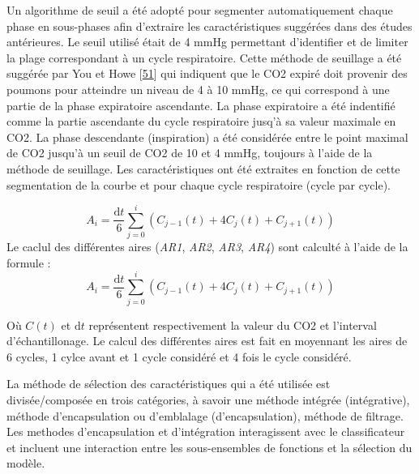 \documentclass[12pt,]{article}
\begin{document}
Un algorithme de seuil a été adopté pour segmenter automatiquement
chaque phase en sous-phases afin d'extraire les caractéristiques
suggérées dans des études antérieures. Le seuil utilisé était de 4 mmHg
permettant d'identifier et de limiter la plage correspondant à un cycle
respiratoire. Cette méthode de seuillage a été suggérée par You et Howe
{[}\protect\hyperlink{ref-you1994expiratory}{51}{]} qui indiquent que le
CO2 expiré doit provenir des poumons pour atteindre un niveau de 4 à 10
mmHg, ce qui correspond à une partie de la phase expiratoire ascendante.
La phase expiratoire a été indentifié comme la partie ascendante du
cycle respiratoire jusq'à sa valeur maximale en CO2. La phase
descendante (inspiration) a été considérée entre le point maximal de CO2
jusqu'à un seuil de CO2 de 10 et 4 mmHg, toujours à l'aide de la méthode
de seuillage. Les caractéristiques ont été extraites en fonction de
cette segmentation de la courbe et pour chaque cycle respiratoire (cycle
par cycle).

\[A_{i}=\frac{\mathrm{d}t}{6}\sum_{j=0}^{i}(C_{j-1}(t)+4C_{j}(t)+C_{j+1}(t))\]
Le caclul des différentes aires (\emph{AR1}, \emph{AR2}, \emph{AR3},
\emph{AR4}) sont calculté à l'aide de la formule : \begin{equation}
  A_{i}=\frac{\mathrm{d}t}{6}\sum_{j=0}^{i}(C_{j-1}(t)+4C_{j}(t)+C_{j+1}(t))
\label{eq:ARi}
\end{equation}

Où \(C(t)\) et \(\mathrm{d}t\) représentent respectivement la valeur du
CO2 et l'interval d'échantillonage. Le calcul des différentes aires est
fait en moyennant les aires de 6 cycles, 1 cylce avant et 1 cycle
considéré et 4 fois le cycle considéré.

La méthode de sélection des caractéristiques qui a été utilisée est
divisée/composée en trois catégories, à savoir une méthode intégrée
(intégrative), méthode d'encapsulation ou d'emblalage (d'encapsulation),
méthode de filtrage. Les methodes d'encapsulation et d'intégration
interagissent avec le classificateur et incluent une interaction entre
les sous-ensembles de fonctions et la sélection du modèle.
\end{document}
